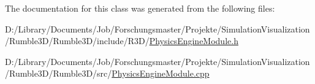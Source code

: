 The documentation for this class was generated from the following files\+:\begin{DoxyCompactItemize}
\item 
D\+:/\+Library/\+Documents/\+Job/\+Forschungsmaster/\+Projekte/\+Simulation\+Visualization/\+Rumble3\+D/\+Rumble3\+D/include/\+R3\+D/\mbox{\hyperlink{_physics_engine_module_8h}{Physics\+Engine\+Module.\+h}}\item 
D\+:/\+Library/\+Documents/\+Job/\+Forschungsmaster/\+Projekte/\+Simulation\+Visualization/\+Rumble3\+D/\+Rumble3\+D/src/\mbox{\hyperlink{_physics_engine_module_8cpp}{Physics\+Engine\+Module.\+cpp}}\end{DoxyCompactItemize}
